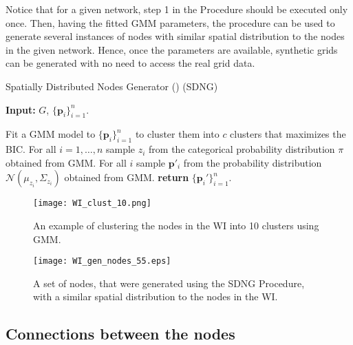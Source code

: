 \documentclass[10pt,journal]{IEEEtran}
\begin{document}
Notice that for a given network, step 1 in the Procedure should be executed only once. Then, having the fitted GMM parameters, the procedure can be used to generate several instances of  nodes with similar spatial distribution to the nodes in the given network. Hence, once the parameters are available, synthetic grids can be generated with no need to access the real grid data.


\setcounter{algocf}{0}
\begin{procedure}[t]
\footnotesize
\caption{Spatially Distributed Nodes Generator () (SDNG)}
\begin{trivlist}
\item\textbf{Input:} $G$, $\{\textbf{p}_i\}_{i=1}^n$.
\end{trivlist}
\vspace*{-3mm}
\begin{algorithmic}[1]
\STATE Fit a GMM model to $\{\textbf{p}_i\}_{i=1}^n$ to cluster them into $c$ clusters that maximizes the BIC.
\STATE For all $i=1,\dots,n$ sample $z_i$ from the categorical probability distribution $\pi$ obtained from GMM.
\STATE For all $i$ sample $\textbf{p}'_i$ from the probability distribution $\mathcal{N}(\mu_{z_i},\Sigma_{z_i})$ obtained from GMM.
\STATE \textbf{return} $\{\textbf{p}_i'\}_{i=1}^n$.
\end{algorithmic}
\label{pro:SDNG}
\end{procedure}

\begin{figure}[t]
\centering
\vspace*{-0.2cm}
\texttt{[image: WI\_clust\_10.png]}
\vspace*{-0.2cm}
\caption{An example of clustering the nodes in the WI into 10 clusters using GMM.}
\label{fig:WI_clust_10}
\vspace*{0.2cm}
\end{figure}

\begin{figure}[t]
\centering
\vspace*{-0.2cm}
\texttt{[image: WI\_gen\_nodes\_55.eps]}
\vspace*{-0.2cm}
\caption{A set of nodes, that were generated using the SDNG Procedure, with a similar spatial distribution to the nodes in the WI.}
\label{fig:WI_gen_nodes_55}
\vspace*{0.2cm}
\end{figure}



\subsection{Connections between the nodes}\label{sec:node_con}
\end{document}
